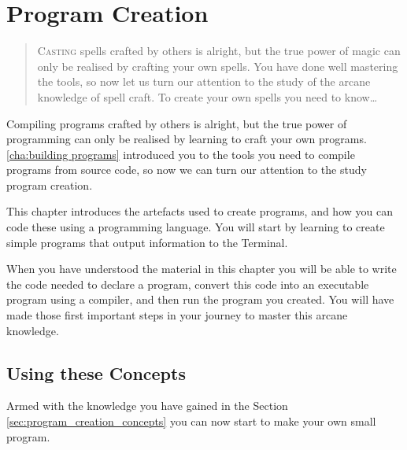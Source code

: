 \chapter{Program Creation} %
\label{cha:program_creation}

\begin{quote}
  \Fontlukas\Large
  \renewcommand{\LettrineTextFont}{\relax}
  \lettrine[image=true,lines=3,lraise=0.1]
  {C}{asting} spells crafted by others is alright, but the true power of magic can only be realised by crafting your own spells. You have done well mastering the tools, so now let us turn our attention to the study of the arcane knowledge of spell craft. To create your own spells you need to know\ldots
\end{quote}

\bigskip

Compiling programs crafted by others is alright, but the true power of programming can only be realised by learning to craft your own programs. \cref{cha:building programs} introduced you to the tools you need to compile programs from source code, so now we can turn our attention to the study program creation.

This chapter introduces the artefacts used to create programs, and how you can code these using a programming language. You will start by learning to create simple programs that output information to the Terminal.

When you have understood the material in this chapter you will be able to write the code needed to declare a program, convert this code into an executable program using a compiler, and then run the program you created. You will have made those first important steps in your journey to master this arcane knowledge. 

\minitoc




\clearpage
\section{Using these Concepts} %
\label{sec:using_these_concepts_program_creation}

Armed with the knowledge you have gained in the Section \ref{sec:program_creation_concepts} you can now start to make your own small program.



